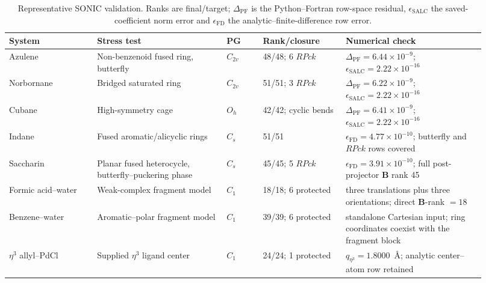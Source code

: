 \documentclass[journal=jctcce,manuscript=article,layout=traditional]{achemso}
\newcommand{\Bmat}{\mathbf{B}}
\theoremstyle{definition}
\begin{document}
\begin{table}[htbp]
\centering
\scriptsize
\setlength{\tabcolsep}{3pt}
\caption{Representative SONIC validation.  Ranks are final/target;
\(\Delta_\mathrm{PF}\) is the Python--Fortran row-space residual,
\(\epsilon_\mathrm{SALC}\) the saved-coefficient norm error and
\(\epsilon_\mathrm{FD}\) the analytic--finite-difference row error.}
\label{tab:validation}
\begin{tabular}{@{}p{0.17\linewidth}p{0.25\linewidth}p{0.07\linewidth}p{0.16\linewidth}p{0.27\linewidth}@{}}
\toprule
System & Stress test & PG & Rank/closure & Numerical check \\
\midrule
Azulene & Non-benzenoid fused ring, butterfly & \(C_{2v}\) & 48/48; 6 \(RPck\) & \(\Delta_\mathrm{PF}=6.44\times10^{-9}\); \(\epsilon_\mathrm{SALC}=2.22\times10^{-16}\) \\
\midrule
Norbornane & Bridged saturated ring & \(C_{2v}\) & 51/51; 3 \(RPck\) & \(\Delta_\mathrm{PF}=6.22\times10^{-9}\); \(\epsilon_\mathrm{SALC}=2.22\times10^{-16}\) \\
\midrule
Cubane & High-symmetry cage & \(O_h\) & 42/42; cyclic bends & \(\Delta_\mathrm{PF}=6.41\times10^{-9}\); \(\epsilon_\mathrm{SALC}=2.22\times10^{-16}\) \\
\midrule
Indane & Fused aromatic/alicyclic rings & \(C_s\) & 51/51 & \(\epsilon_\mathrm{FD}=4.77\times10^{-10}\); butterfly and \(RPck\) rows covered \\
\midrule
Saccharin & Planar fused heterocycle, butterfly--puckering phase & \(C_s\) & 45/45; 5 \(RPck\) & \(\epsilon_\mathrm{FD}=3.91\times10^{-10}\); full post-projector \(\Bmat\) rank 45 \\
\midrule
Formic acid--water & Weak-complex fragment model & \(C_1\) & 18/18; 6 protected & three translations plus three orientations; direct \(\Bmat\)-rank \(=18\) \\
\midrule
Benzene--water & Aromatic--polar fragment model & \(C_1\) & 39/39; 6 protected & standalone Cartesian input; ring coordinates coexist with the fragment block \\
\midrule
$\eta^3$ allyl--PdCl & Supplied $\eta^3$ ligand center & \(C_1\) & 24/24; 1 protected & \(q_{\eta^3}=1.8000\)~\AA; analytic center--atom row retained \\
\bottomrule
\end{tabular}
\end{table}
\end{document}
